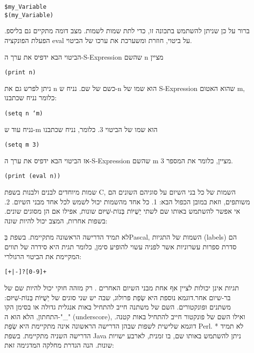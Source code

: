 \begin{verbatim}
$my_Variable
$(my_Variable)
\end{verbatim}
      ברור על כן שניתן להשתמש בתכונה זו, כדי לתת שמות לשמות.
      מצב דומה מתקיים גם בליספ. הפעלת הפונקציה eval על ביטוי, חוזרת ומשערכת את ערכו של הביטוי.
      \begin{ציינון}
\item הביטוי הבא ידפיס את ערך ה-S-Expression שהשם n מציין
    \end{ציינון}
\begin{verbatim}
(print n)
\end{verbatim}
      \begin{ציינון}
\item ניתן לפרש גם את n כשם של שם. נניח ש-n הוא שמו של S-Expression שהוא האטום m, כלומר נניח שכתבנו:
    \end{ציינון}
\begin{verbatim}
(setq n ‘m)
\end{verbatim}
      נניח עוד ש-m הוא שמו של הביטוי 3. כלומר, נניח שכתבנו
\begin{verbatim}
(setq m 3)
\end{verbatim}
      אז הביטוי הבא ידפיס את ערך ה-S-Expression שהשם m מציין, כלומר את המספר 3.
\begin{verbatim}
(print (eval n))
\end{verbatim}
      שמות מיוחדים לבנים ולבנות
      בשפת C, השמות של כל בני השיום על סוגיהם השונים הם משותפים, וזאת במובן הכפול הבא:
      1. כל אחד מהשמות יכול לשמש לכל אחד מבני השיום.
      2. אי אפשר להשתמש באותו שם לשתי יֵשֻׁיּוֹת בְּנוֹת-שִׁיּוּם שונות, אפילו אם הן מסוגים שונים.
      בשפות אחרות, המצב יכול להיות שונה:
      \begin{ציינון}
\item לא תמיד הדרישה הראשונה מתקיימת. בשפת בְּPascal, השמות של התגיות (labels) הם סדרת ספרות עשרוניות אשר לפניה עשוי להופיע סימן, כלומר תגית היא סידרה של תווים המקיימת את הביטוי הרגולרי:
    \end{ציינון}
\begin{verbatim}
[+|-]?[0-9]+
\end{verbatim}
      תגיות אינן יכולות לציין אף אחת מבני השיום האחרים . רק מזהה חוקי יכול להיות שם
      של בר-שיום אחר.דוגמא נוספת היא שְׂפַת פרולוג, שבה יש שני סוגים של יֵשֻׁיּוֹת
      בְּנוֹת-שִׁיּוּם: משתנים ופונקטורים. השם של משתנה חייב להתחיל באות אנגלית גדולה או
      בסימן הקו התחתון, הלא הוא ה-"\_" (underscore), ואילו השם של פונקטור חייב להתחיל
      באות קטנה. דוגמא שלישית לשפות שבהן הדרישה הראשונה אינה מתקיימת היא שְׂפַת Perl. *
      לא תמיד הדרישה השניה מתקיימת. בשפת Java ניתן להשתמש באותו שם, בו זמנית, לארבע
      ישויות שונות. הנה הגדרת מחלקה המדגימה זאת:

